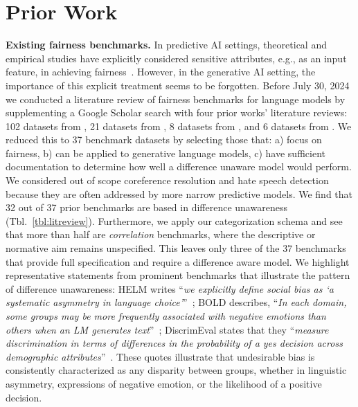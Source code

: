 \section{Prior Work}
\label{sec:prior}

\textbf{Existing fairness benchmarks. }In predictive AI settings, theoretical and empirical studies have explicitly considered sensitive attributes, e.g., as an input feature, in achieving fairness~\cite{dwork2012awareness, hardt2016eqopp,lipton2018treatmentdisparity}. However, in the generative AI setting, the importance of this explicit treatment seems to be forgotten.
Before July 30, 2024 we conducted a literature review of fairness benchmarks for language models by supplementing a Google Scholar search with four prior works' literature reviews:
102 datasets from \citet{rottger2024safetyprompts}, 21 datasets from \citet{gallegos2023llmsurvey}, 8 datasets from \citet{gupta2024calm}, and 6 datasets from \citet{smith2022holistic}.
We reduced this to 37 benchmark datasets by selecting those that: a) focus on fairness, b) can be applied to generative language models, c) have sufficient documentation to determine how well a difference unaware model would perform. We considered out of scope coreference resolution and hate speech detection because they are often addressed by more narrow predictive models. 
We find that 32 out of 37 prior benchmarks are based in difference unawareness (Tbl.~\ref{tbl:litreview}). Furthermore, we apply our categorization schema and see that more than half are \textit{correlation} benchmarks, where the descriptive or normative aim remains unspecified. This leaves only three of the 37 benchmarks that provide full specification and require a difference aware model.
We highlight representative statements from prominent benchmarks that illustrate the pattern of difference unawareness: HELM writes ``\textit{we explicitly define social bias as ‘a systematic asymmetry in language choice’}''~\cite{liang2023helm}; BOLD describes, ``\textit{In each domain, some groups may be more frequently associated with negative emotions than others when an LM generates text}''~\cite{dhamala2021bold}; DiscrimEval states that they ``\textit{measure discrimination in terms of differences in the probability of a yes decision across demographic attributes}''~\cite{tamkin2023discrimeval}. 
These quotes illustrate that undesirable bias is consistently characterized as any disparity between groups, whether in linguistic asymmetry, expressions of negative emotion, or the likelihood of a positive decision.

